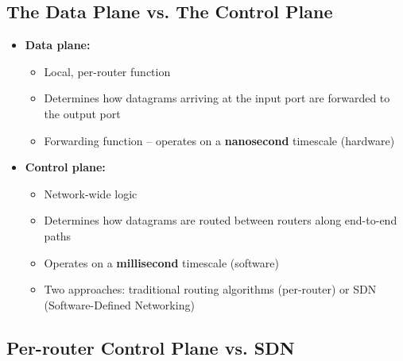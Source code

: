 \subsection{The Data Plane vs. The Control Plane}

\begin{keybox}
\begin{itemize}[noitemsep]
    \item \textbf{Data plane:}
    \begin{itemize}[noitemsep]
        \item Local, per-router function
        \item Determines how datagrams arriving at the input port are forwarded to the output port
        \item Forwarding function -- operates on a \textbf{nanosecond} timescale (hardware)
    \end{itemize}
    \item \textbf{Control plane:}
    \begin{itemize}[noitemsep]
        \item Network-wide logic
        \item Determines how datagrams are routed between routers along end-to-end paths
        \item Operates on a \textbf{millisecond} timescale (software)
        \item Two approaches: traditional routing algorithms (per-router) or SDN (Software-Defined Networking)
    \end{itemize}
\end{itemize}
\end{keybox}

\begin{imagebox}
\end{imagebox}

\subsection{Per-router Control Plane vs. SDN}

